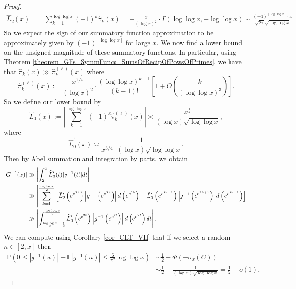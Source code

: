 \documentclass[11pt,reqno,a4letter]{article}
\numberwithin{figure}{section}
\numberwithin{table}{section}
\newcommand{\ceiling}[1]{\left\lceil #1 \right\rceil}
\theoremstyle{plain}
\numberwithin{theorem}{section}
\theoremstyle{definition}
\begin{document}
\begin{proof}
\begin{align*} 
\widehat{L}_2(x) & = \sum_{k=1}^{\log\log x} (-1)^{k} \widehat{\pi}_k(x) 
     = - \frac{x}{(\log x)^2} \cdot \Gamma(\log\log x, -\log\log x) 
     \sim \frac{(-1)^{\ceiling{\log\log x}} \cdot x}{\sqrt{2\pi} \sqrt{\log\log x}}
\end{align*} 
So we expect the sign of our summatory function approximation to be approximately 
given by $(-1)^{\ceiling{\log\log x}}$ for large $x$. 
We now find a lower bound on the unsigned magnitude of these summatory functions. 
In particular, using Theorem \ref{theorem_GFs_SymmFuncs_SumsOfRecipOfPowsOfPrimes}, 
we have that $\widehat{\pi}_k(x) \gg \widehat{\pi}_k^{(\ell)}(x)$ where 
\[
\widehat{\pi}_k^{(\ell)}(x) := \frac{x^{1/4}}{(\log x)^{2}} \cdot 
     \frac{(\log\log x)^{k-1}}{(k-1)!} \left[1 + 
     O\left(\frac{k}{(\log\log x)^3}\right)\right].
\]
So we define our lower bound by 
\[
\widehat{L}_0(x) := \left\lvert \sum_{k=1}^{\log\log x} (-1)^{k} \widehat{\pi}_k^{(\ell)}(x) \right\rvert 
     \asymp \frac{x^{\frac{1}{4}}}{(\log x) \sqrt{\log\log x}}, 
\]
where 
\[
\widehat{L}_0^{\prime}(x) \asymp \frac{1}{x^{3/4} \cdot (\log x) \sqrt{\log\log x}}. 
\]
Then by Abel summation and integration by parts, we obtain 
\begin{align} 
\notag 
|G^{-1}(x)| & \gg \left\lvert \int_2^x \widehat{L}_0^{\prime}(t) |g^{-1}(t)| dt \right\rvert \\ 
\notag 
     & \gg \left\lvert \sum_{k=1}^{\frac{\log\log x}{2}} \left[ 
     \widehat{L}_2^{\prime}\left(e^{e^{2k}}\right) \left\lvert g^{-1}\left(e^{e^{2k}}\right) \right\rvert 
     d\left(e^{e^{2k}}\right) - 
     \widehat{L}_0^{\prime}\left(e^{e^{2k+1}}\right) \left\lvert g^{-1}\left(e^{e^{2k+1}}\right) \right\rvert 
     d\left(e^{e^{2k+1}}\right)\right] \right\rvert \\ 
\label{eqn_proof_tag_AbsGInvxApproxLowerBound_v1} 
     & \gg \left\lvert \int_{\frac{\log\log x}{2} - \frac{1}{2}}^{\frac{\log\log x}{2}} 
     \widehat{L}_0^{\prime}\left(e^{e^{2t}}\right) \left\lvert g^{-1}\left(e^{e^{2t}}\right) \right\rvert 
     d\left(e^{e^{2t}}\right) dt \right\rvert.
\end{align} 
We can compute using Corollary \ref{cor_CLT_VII} that 
if we select a random $n \in [2, x]$ then 
\begin{align*} 
\mathbb{P}\left(0 \leq |g^{-1}(n)| - \mathbb{E}|g^{-1}(n)| \leq \frac{6}{\pi^2} \log\log x\right) & 
     \sim \frac{1}{2} - \Phi\left(-\sigma_x(C)\right) \\ 
     & \sim \frac{1}{2} - \frac{1}{(\log x) \sqrt{\log\log x}} = \frac{1}{2} + o(1), 

\end{align*}
\end{proof}
\end{document}
